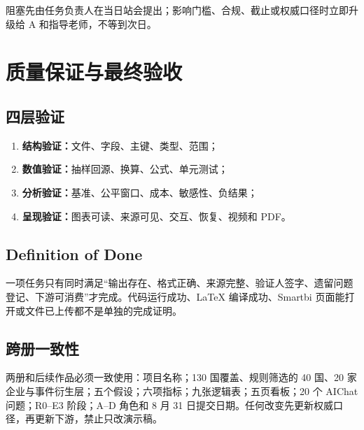 \documentclass[UTF8,12pt,openany]{ctexbook}
\begin{document}
阻塞先由任务负责人在当日站会提出；影响门槛、合规、截止或权威口径时立即升级给 A 和指导老师，不等到次日。

\chapter{质量保证与最终验收}

\section{四层验证}
\begin{enumerate}
  \item \textbf{结构验证：}文件、字段、主键、类型、范围；
  \item \textbf{数值验证：}抽样回源、换算、公式、单元测试；
  \item \textbf{分析验证：}基准、公平窗口、成本、敏感性、负结果；
  \item \textbf{呈现验证：}图表可读、来源可见、交互、恢复、视频和 PDF。
\end{enumerate}

\section{Definition of Done}
一项任务只有同时满足“输出存在、格式正确、来源完整、验证人签字、遗留问题登记、下游可消费”才完成。代码运行成功、LaTeX 编译成功、Smartbi 页面能打开或文件已上传都不是单独的完成证明。

\section{跨册一致性}
两册和后续作品必须一致使用：项目名称；130 国覆盖、规则筛选的 40 国、20 家企业与事件衍生层；五个假设；六项指标；九张逻辑表；五页看板；20 个 AIChat 问题；R0--E3 阶段；A--D 角色和 8 月 31 日提交日期。任何改变先更新权威口径，再更新下游，禁止只改演示稿。
\end{document}
